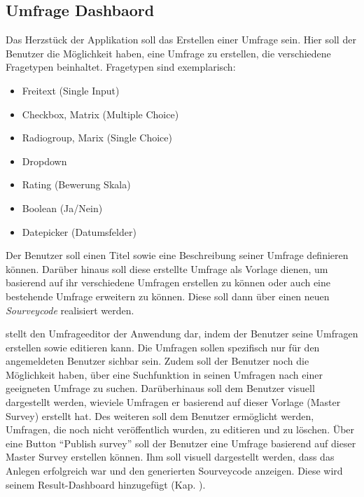 \subsection{Umfrage Dashbaord}
\label{ssec:UmfrageDashboard}

Das Herzstück der Applikation soll das Erstellen einer Umfrage sein. 
Hier soll der Benutzer die Möglichkeit haben, eine Umfrage zu erstellen, die verschiedene Fragetypen beinhaltet. 
Fragetypen sind exemplarisch: 
%
\begin{itemize}
	\item Freitext (Single Input)
	\item Checkbox, Matrix (Multiple Choice)
	\item Radiogroup, Marix (Single Choice)
	\item Dropdown 
	\item Rating (Bewerung Skala)
	\item Boolean (Ja/Nein)
	\item Datepicker (Datumsfelder)
\end{itemize}
%
Der Benutzer soll einen Titel sowie eine Beschreibung seiner Umfrage definieren können. 
Darüber hinaus soll diese erstellte Umfrage als Vorlage  dienen, um basierend auf ihr verschiedene Umfragen erstellen zu können oder auch eine bestehende Umfrage erweitern zu können. 
Diese soll dann über einen neuen \emph{Sourveycode} realisiert werden. 

\abb {} stellt den Umfrageeditor der Anwendung dar, indem der Benutzer seine Umfragen erstellen sowie editieren kann. 
Die Umfragen sollen spezifisch nur für den angemeldeten Benutzer sichbar sein. 
Zudem soll der Benutzer noch die Möglichkeit haben, über eine Suchfunktion in seinen Umfragen nach einer geeigneten Umfrage zu suchen. \newline
Darüberhinaus soll dem Benutzer visuell dargestellt werden, wieviele Umfragen er basierend auf dieser Vorlage (Master Survey) erstellt hat. 
Des weiteren soll dem Benutzer ermöglicht werden, Umfragen, die noch nicht veröffentlich wurden, zu editieren und zu löschen. \newline
Über eine Button \enquote{Publish survey} soll der Benutzer eine Umfrage basierend auf dieser Master Survey erstellen können. 
Ihm soll visuell dargestellt werden, dass das Anlegen erfolgreich war und den generierten Sourveycode anzeigen. 
Diese wird seinem Result-Dashboard hinzugefügt (Kap. ). 

